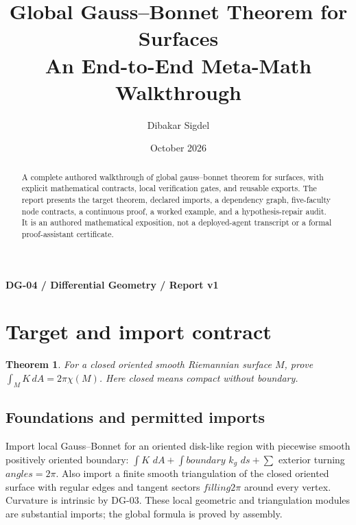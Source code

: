 \documentclass[preprint,12pt,aps,pra,showkeys,amsmath,amssymb,superscriptaddress,floatfix]{revtex4-2}
\newtheorem{theorem}{Theorem}[section]
\theoremstyle{definition}
\theoremstyle{remark}
\begin{document}
\title{Global Gauss--Bonnet Theorem for Surfaces\\[4pt]\large An End-to-End Meta-Math Walkthrough}

\author{Dibakar Sigdel}


\date{October 2026}

\begin{abstract}

A complete authored walkthrough of global gauss--bonnet theorem for
surfaces, with explicit mathematical contracts, local verification
gates, and reusable exports. The report presents the target theorem,
declared imports, a dependency graph, five-faculty node contracts, a
continuous proof, a worked example, and a hypothesis-repair audit. It is
an authored mathematical exposition, not a deployed-agent transcript or
a formal proof-assistant certificate.

\end{abstract}\maketitle\linespread{1.12}\selectfont

\noindent\textbf{DG-04 / Differential Geometry / Report v1}

\section{Target and import contract}

\begin{theorem}

For a closed oriented smooth Riemannian surface \(M\), prove
\(\int_M K\,dA=2\pi\chi(M)\). Here closed means compact without
boundary.

\end{theorem}

\subsection{Foundations and permitted imports}

Import local Gauss--Bonnet for an oriented disk-like region with
piecewise smooth positively oriented boundary: \(\int K\)
\(dA+\int boundary\) \(k_g\) \(ds+\sum\) exterior turning
\(angles=2\pi\). Also import a finite smooth triangulation of the closed
oriented surface with regular edges and tangent sectors \(filling2\pi\)
around every vertex. Curvature is intrinsic by DG-03. These local
geometric and triangulation modules are substantial imports; the global
formula is proved by assembly.
\end{document}
